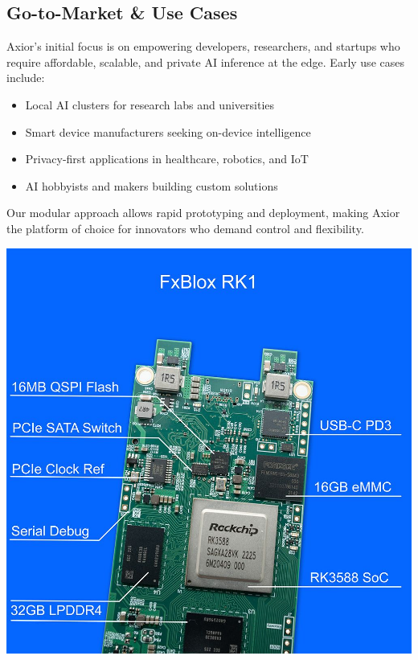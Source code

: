 \documentclass[12pt]{article}
\begin{document}
\begin{multicols}{2}
\subsection{Go-to-Market \& Use Cases}
Axior’s initial focus is on empowering developers, researchers, and startups who require affordable, scalable, and private AI inference at the edge. Early use cases include:
\begin{itemize}[leftmargin=*, itemsep=0pt, topsep=2pt]
    \item Local AI clusters for research labs and universities
    \item Smart device manufacturers seeking on-device intelligence
    \item Privacy-first applications in healthcare, robotics, and IoT
    \item AI hobbyists and makers building custom solutions
\end{itemize}
\vspace{0.3em}
Our modular approach allows rapid prototyping and deployment, making Axior the platform of choice for innovators who demand control and flexibility.

\begin{center}
    \includegraphics[width=\linewidth]{./assets/FxBlox_RK1.jpg} %
\end{center}
\vspace{1em}


\end{multicols}
\end{document}
